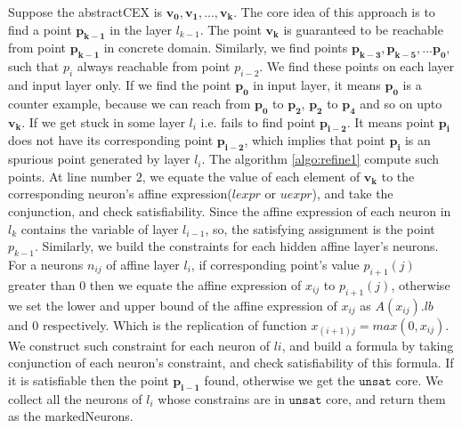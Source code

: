 Suppose the abstractCEX is $\boldsymbol{v_0}, \boldsymbol{v_1}, ... , \boldsymbol{v_k}$. 
The core idea of this approach is to find a point $\boldsymbol{p_{k-1}}$ in the layer $l_{k-1}$. 
The point $\boldsymbol{v_k}$ is guaranteed to be reachable from point $\boldsymbol{p_{k-1}}$ in concrete domain.
Similarly, we find points $\boldsymbol{p_{k-3}}, \boldsymbol{p_{k-5}}, ... \boldsymbol{p_0}$, 
such that $p_i$ always reachable from point $p_{i-2}$. 
We find these points on each \relu{} layer and input layer only. 
If we find the point $\boldsymbol{p_0}$ in input layer, it means $\boldsymbol{p_0}$ is a counter example, 
because we can reach from $\boldsymbol{p_0}$ to $\boldsymbol{p_2}$, $\boldsymbol{p_2}$ to $\boldsymbol{p_4}$ 
and so on upto $\boldsymbol{v_k}$. 
If we get stuck in some layer $l_i$ i.e. fails to find point 
$\boldsymbol{p_{i-2}}$. It means point $\boldsymbol{p_i}$ does not have its corresponding point $\boldsymbol{p_{i-2}}$, 
which implies that point $\boldsymbol{p_i}$ is an spurious point generated by \relu{} layer $l_i$. 
The algorithm \ref{algo:refine1} compute such points. At line number $2$, we equate the value of 
each element of $\boldsymbol{v_k}$ to the corresponding neuron's affine expression($lexpr$ or $uexpr$), 
and take the conjunction, and check satisfiability. Since the affine expression of each neuron in $l_k$ contains the 
variable of layer $l_{i-1}$, so, the satisfying assignment is the point $p_{k-1}$. Similarly, we build the constraints
for each hidden affine layer's neurons. For a neurons $n_{ij}$ of affine layer $l_i$, 
if corresponding point's value $p_{i+1}(j)$ greater than $0$ then we equate the affine expression of $x_{ij}$ to $p_{i+1}(j)$,
otherwise we set the lower and upper bound of the affine expression of $x_{ij}$ as $A(x_{ij}).lb$ and $0$ respectively. 
Which is the replication of \relu{} function $x_{(i+1)j} = max(0, x_{ij})$. We construct such constraint 
for each neuron of $li$, and build a formula by taking conjunction of each neuron's constraint, 
and check satisfiability of this formula. If it is satisfiable then the point $\boldsymbol{p_{i-1}}$ found, 
otherwise we get the $\mathtt{unsat}$ core. We collect all the neurons of $l_i$ whose constrains are 
in $\mathtt{unsat}$ core, and return them as the markedNeurons.   

